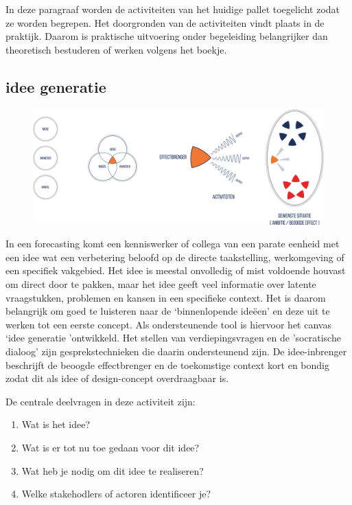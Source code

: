 \documentclass[
]{book}
\providecommand{\tightlist}{%
  \setlength{\itemsep}{0pt}\setlength{\parskip}{0pt}}
\begin{document}
In deze paragraaf worden de activiteiten van het huidige pallet toegelicht zodat ze worden begrepen. Het doorgronden van de activiteiten vindt plaats in de praktijk. Daarom is praktische uitvoering onder begeleiding belangrijker dan theoretisch bestuderen of werken volgens het boekje.

\hypertarget{idee-generatie}{%
\subsection{idee generatie}\label{idee-generatie}}

\begin{figure}

{\centering \includegraphics[width=0.9\linewidth]{data/images/20210401-MDI-ideegeneratie} 

}

\caption{ }\label{fig:unnamed-chunk-8}
\end{figure}

In een forecasting komt een kenniswerker of collega van een parate eenheid met een idee wat een verbetering beloofd op de directe taakstelling, werkomgeving of een specifiek vakgebied. Het idee is meestal onvolledig of mist voldoende houvast om direct door te pakken, maar het idee geeft veel informatie over latente vraagstukken, problemen en kansen in een specifieke context. Het is daarom belangrijk om goed te luisteren naar de `binnenlopende ideëen' en deze uit te werken tot een eerste concept. Als ondersteunende tool is hiervoor het canvas `idee generatie 'ontwikkeld. Het stellen van verdiepingsvragen en de 'socratische dialoog' zijn gesprekstechnieken die daarin ondersteunend zijn. De idee-inbrenger beschrijft de beoogde effectbrenger en de toekomstige context kort en bondig zodat dit als idee of design-concept overdraagbaar is.

De centrale deelvragen in deze activiteit zijn:

\begin{enumerate}
\def\labelenumi{\arabic{enumi}.}
\tightlist
\item
  Wat is het idee?
\item
  Wat is er tot nu toe gedaan voor dit idee?
\item
  Wat heb je nodig om dit idee te realiseren?
\item
  Welke stakehodlers of actoren identificeer je?
\end{enumerate}
\end{document}
